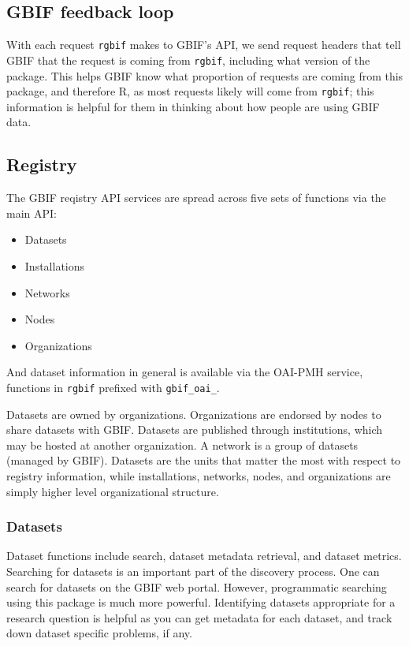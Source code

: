 \documentclass[author-year, review, 11pt]{components/elsarticle} %
\begin{document}
\subsection{GBIF feedback loop}\label{gbif-feedback-loop}

With each request \texttt{rgbif} makes to GBIF's API, we send request
headers that tell GBIF that the request is coming from \texttt{rgbif},
including what version of the package. This helps GBIF know what
proportion of requests are coming from this package, and therefore R, as
most requests likely will come from \texttt{rgbif}; this information is
helpful for them in thinking about how people are using GBIF data.

\subsection{Registry}\label{registry}

The GBIF reqistry API services are spread across five sets of functions
via the main API:

\begin{itemize}
\itemsep1pt\parskip0pt
\item
  Datasets
\item
  Installations
\item
  Networks
\item
  Nodes
\item
  Organizations
\end{itemize}

And dataset information in general is available via the OAI-PMH service,
functions in \texttt{rgbif} prefixed with \texttt{gbif\_oai\_}.

Datasets are owned by organizations. Organizations are endorsed by nodes
to share datasets with GBIF. Datasets are published through
institutions, which may be hosted at another organization. A network is
a group of datasets (managed by GBIF). Datasets are the units that
matter the most with respect to registry information, while
installations, networks, nodes, and organizations are simply higher
level organizational structure.

\subsubsection{Datasets}\label{datasets}

Dataset functions include search, dataset metadata retrieval, and
dataset metrics. Searching for datasets is an important part of the
discovery process. One can search for datasets on the GBIF web portal.
However, programmatic searching using this package is much more
powerful. Identifying datasets appropriate for a research question is
helpful as you can get metadata for each dataset, and track down dataset
specific problems, if any.
\end{document}
